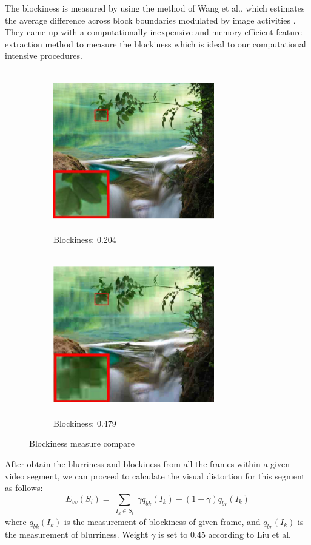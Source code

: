 \documentclass[12pt]{article}
\begin{document}
\par
The blockiness is measured by using the method of Wang et al., which estimates the average difference across block boundaries modulated by image activities \cite{Wang}. They came up with a computationally inexpensive and memory efficient feature extraction method to measure the blockiness which is ideal to our computational intensive procedures.
\begin{figure}[h]
	\begin{subfigure}[h]{0.49 \textwidth}
	\centering
	\includegraphics[width=7cm, height=7cm]{a1}
	\caption{Blockiness: 0.204}
	\label{default}
	\end{subfigure}
	\hspace{1cm}
	\begin{subfigure}[h]{0.49 \textwidth}
	\centering
	\includegraphics[width=7cm, height=7cm]{b1}
	\caption{Blockiness: 0.479}
	\label{default}
	\end{subfigure}
\caption{Blockiness measure compare}
\end{figure}

After obtain the blurriness and blockiness from all the frames within a given video segment, we can proceed to calculate the visual distortion for this segment as follows:
\begin{equation}
\mathit{E_{vv}(S_i)} = \sum_{\substack{\mathit{I_k\in S_i}}}\gamma \mathit{q_{bk}(I_k)} + (1 - \gamma)\mathit{q_{br}(I_k)}
\end{equation} 
where $\mathit{q_{bk}(I_k)}$ is the measurement of blockiness of given frame, and $\mathit{q_{br}(I_k)}$ is the measurement of blurriness. Weight $\gamma$ is set to 0.45 according to Liu et al. \cite{Liu}
\end{document}

